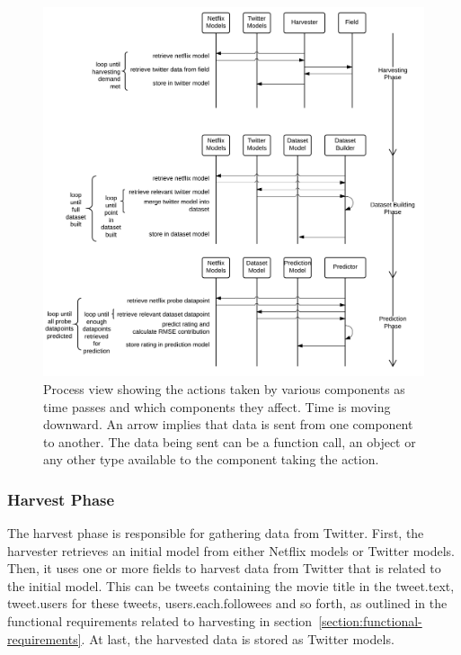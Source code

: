 \begin{figure}[H]
\centerline{\includegraphics[width=7in]{image/architecture-process-view.png}}
\caption[Process View]{Process view showing the actions taken by various components as time passes and which components they affect. Time is moving downward. An arrow implies that data is sent from one component to another. The data being sent can be a function call, an object or any other type available to the component taking the action.}
\label{figure:process-view}
\end{figure}

\subsubsection{Harvest Phase}
The harvest phase is responsible for gathering data from Twitter. First, the harvester retrieves an initial model from either Netflix models or Twitter models. Then, it uses one or more fields to harvest data from Twitter that is related to the initial model. This can be tweets containing the movie title in the tweet.text, tweet.users for these tweets, users.each.followees and so forth, as outlined in the functional requirements related to harvesting in section~\ref{section:functional-requirements}. At last, the harvested data is stored as Twitter models.

